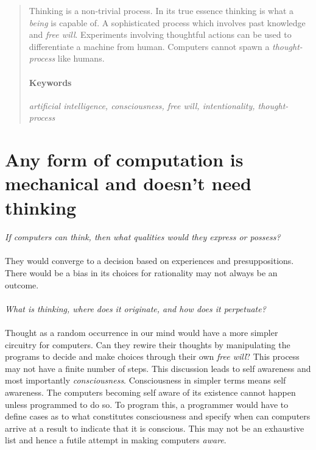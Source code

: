 \documentclass[a4paper]{article}
\begin{document}
	
	\maketitle
	
	\begin{abstract}
	Thinking is a non-trivial process. In its true essence thinking is what a \textit{being} is capable of. A sophisticated process which involves past knowledge
	and \textit{free will}. Experiments involving thoughtful actions can be used to differentiate a machine from human. Computers cannot spawn a \textit{thought-process} like humans.
	\paragraph{Keywords} \textit{artificial intelligence, consciousness, free will, intentionality, thought-process}
	\end{abstract}
	
	\section{Any form of computation is mechanical and doesn't need thinking}
	\paragraph{}
	\textit{If computers can think, then what qualities would they express or possess?}
	\paragraph{}They would converge to a decision based on experiences and presuppositions. There would be a bias
	in its choices for rationality may not always be an outcome.
	\paragraph{}
	\textit{What is thinking, where does it originate, and how does it perpetuate?}
	\paragraph{}
	Thought as a random occurrence in our mind would have a more simpler circuitry for computers. Can they
	rewire their thoughts by manipulating the programs to decide and make choices through their own \textit{free will}? This process may not have a finite number of steps. This discussion leads to self awareness and most importantly \textit{consciousness}. Consciousness in simpler terms means self awareness. The computers becoming self aware of its existence cannot happen unless programmed to do so. To program this, a programmer would have to define cases as to what constitutes consciousness and specify when can computers arrive at a result to indicate that it is conscious. This may not be an exhaustive list and hence a futile attempt in making computers \textit{aware}.
\end{document}

